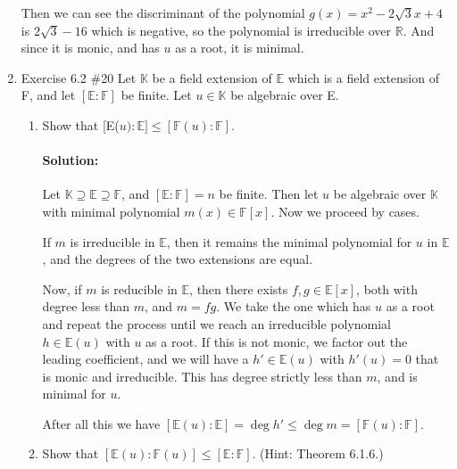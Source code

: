 \documentclass{article}
\begin{document}
\begin{enumerate}
Then we can see the discriminant of the polynomial $g(x)=x^2-2\sqrt{3} x+4$ is $2\sqrt{3} -16$ which is negative,
so the polynomial is irreducible over $\mathbb{R}$. And since it is monic, and has $u$ as a root, it is minimal.
\newpage

\item Exercise 6.2 \#20 Let $\mathbb{K}$ be a field extension of $\mathbb{E}$ which is a field extension of F,
    and let $[\mathbb{E}:\mathbb{F}]$ be finite. Let $u\in\mathbb{K}$ be algebraic over E.
\begin{enumerate}              
    \item Show that [E($u):\mathbb{E}]\leq[\mathbb{F}(u):\mathbb{F}].$
        \paragraph{Solution:} Let $\mathbb{K}\supseteq \mathbb{E}\supseteq \mathbb{F}$, and $[\mathbb{E}:\mathbb{F}]=n$ be finite. Then let $u$ be algebraic over $\mathbb{K}$ with 
        minimal polynomial $m(x)\in \mathbb{F}[x]$. Now we proceed by cases.

        If $m$ is irreducible in $\mathbb{E}$, then
        it remains the minimal polynomial for $u$ in $\mathbb{E}$, and the degrees of the two extensions are equal.

        Now, if $m$ is reducible in $\mathbb{E}$, then there exists $f,g\in \mathbb{E}[x]$, both with degree less than $m$,
        and $m=fg$. We take the one which has $u$ as a root and repeat the process until we reach an irreducible polynomial 
        $h\in  \mathbb{E}(u)$ with $u$ as a root.
        If this is not monic, we factor out the leading coefficient, and we will have a $h'\in \mathbb{E}(u)$ with 
        $h'(u)=0$ that is monic and irreducible. This has degree
        strictly less than $m$, and is minimal for $u$.

        After all this we have $[\mathbb{E}(u):\mathbb{E}]=\deg  h' \leq\deg m=[\mathbb{F}(u):\mathbb{F}]$.

    \item Show that $[\mathbb{E}(u):\mathbb{F}(u)]\leq[\mathbb{E}:\mathbb{F}].$ (Hint: Theorem 6.1.6.)

\end{enumerate}
\end{enumerate}
\end{document}
